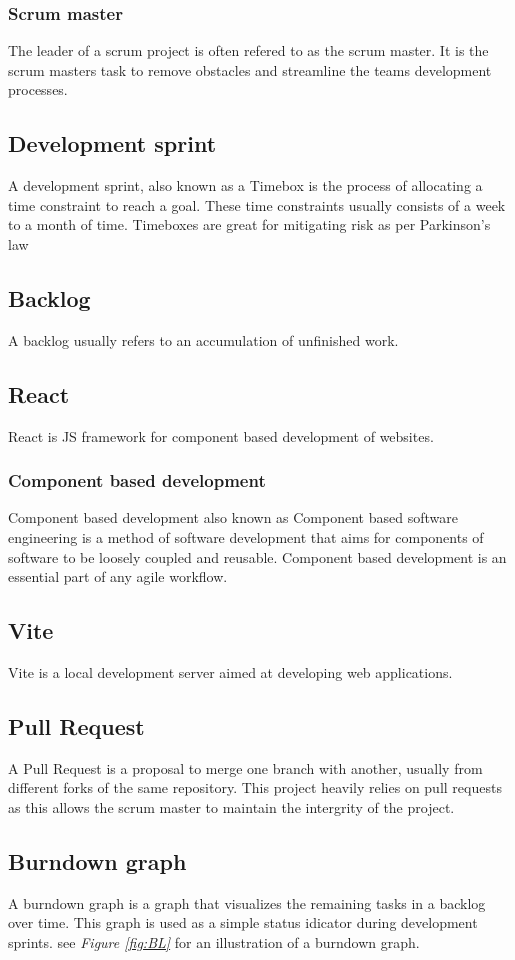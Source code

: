 \documentclass[12pt]{article}
\begin{document}
\subsubsection{Scrum master}
The leader of a scrum project is often refered to as the scrum master.
It is the scrum masters task to remove obstacles and streamline the teams development processes.
\subsection{Development sprint\cite{Timeboxing2024}}
A development sprint, also known as a Timebox is the process of allocating a time constraint to
reach a goal. These time constraints usually consists of a week to a month of time.
Timeboxes are great for mitigating risk as per Parkinson's law\cite{ParkinsonLaw2024}
\subsection{Backlog\cite{Backlog2022}}
A backlog usually refers to an accumulation of unfinished work.
\subsection{React\cite{React}}
React is JS\cite{ECMA262} framework for component based development of websites.
\subsubsection{Component based development\cite*{ComponentbasedSoftwareEngineering2024}}
Component based development also known as Component based software engineering is a method of software development
that aims for components of software to be loosely coupled and reusable. Component based development is an 
essential part of any agile workflow.
\subsection{Vite\cite{Vite}}
Vite is a local development server aimed at developing web applications.
\subsection{Pull Request\cite{PullRequests}}
A Pull Request is a proposal to merge one branch with another, usually from different forks of the same repository.
This project heavily relies on pull requests as this allows the scrum master to maintain the intergrity of the project.
\subsection{Burndown graph\cite{BurndownChart2024}}
A burndown graph is a graph that visualizes the remaining tasks in a backlog over time.
This graph is used as a simple status idicator during development sprints.
see \textit{Figure \ref{fig:BL}} for an illustration of a burndown graph.
\end{document}
